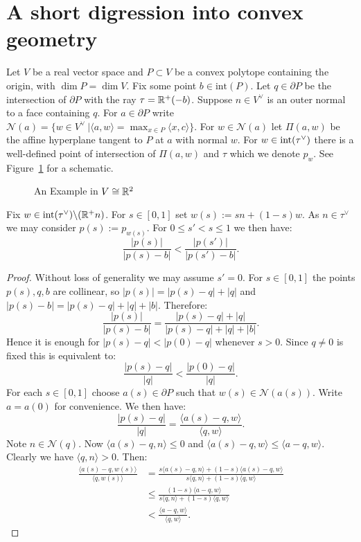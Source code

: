 \section{A short digression into convex geometry}
Let \(V\) be a real vector space and \(P \subset V\) be a convex polytope containing the origin, with \(\dim P = \dim V\). Fix some point \(b \in \text{int}(P)\). Let \(q \in \partial P\) be the intersection of \(\partial P\) with the ray \(\tau = \mathbb{R}^+ (-b)\). Suppose \(n \in V^\vee\) is an outer normal to a face containing \(q\). For \(a \in \partial P\) write \(\mathcal{N}(a) = \{w\in V^\vee \ | \langle a,w \rangle = \max_{x \in P} \langle x,c \rangle \}\). For \(w \in \mathcal{N}(a) \) let \(\Pi(a,w)\) be the affine hyperplane tangent to \(P\) at \(a\) with normal \(w\). For \(w \in \text{int}(\tau^\vee) \) there is a well-defined point of intersection of \(\Pi(a,w)\) and \(\tau\) which we denote \(p_w\). See Figure~\ref{schematic} for a schematic.
\begin{figure}[h] \centering
{}
\caption{An Example in \(V \cong \mathbb{R}^2\)}
\label{schematic}
\end{figure}
\begin{lemma} \label{R(X):Lemma3.1}
Fix \(w \in \text{int}(\tau^\vee) \backslash (\mathbb{R}^+ n)\). For \(s \in [0,1]\) set \(w(s) := sn + (1-s)w\). As \(n \in \tau^\vee \) we may consider \(p(s) := p_{w(s)}\). For \(0 \le s' < s \le 1\) we then have:
\[
\frac{|p(s)|}{|p(s)-b|} < \frac{|p(s')|}{|p(s')-b|}.
\]
\end{lemma}
\begin{proof}
Without loss of generality we may assume \(s' = 0\). For \(s \in [0,1]\) the points \(p(s), q,b\) are collinear, so \(|p(s)|= |p(s)-q|+|q|\) and \(|p(s)-b| =|p(s)-q| +|q| + |b| \). Therefore:
\[
\frac{|p(s)|}{|p(s) - b|} = \frac{|p(s)-q|+|q|}{|p(s)-q| +|q| + |b|}.
\]
Hence it is enough for \(|p(s)-q| < |p(0)-q|\) whenever \(s >0\). Since \(q \neq 0\) is fixed this is equivalent to:
\[
\frac{|p(s) - q|}{|q|} < \frac{|p(0) - q|}{|q|}.
\]
For each \(s \in [0,1]\) choose \(a(s) \in \partial P\) such that \(w(s) \in \mathcal{N}(a(s))\). Write \(a = a(0)\) for convenience. We then have:
\[
\frac{|p(s)-q|}{|q|} = \frac{\langle a(s)-q, w \rangle }{\langle q,w \rangle}.
\]
Note \(n \in \mathcal{N}(q)\). Now \(\langle a(s)-q,n \rangle \le 0\)  and \( \langle a(s) - q,w \rangle \le \langle a - q,w \rangle\). Clearly we have \(\langle q , n \rangle > 0\). Then:
\begin{align*}
\frac{\langle a(s) - q, w(s) \rangle }{\langle q, w(s) \rangle} &= \frac{s\langle a(s)-q, n \rangle + (1-s)\langle a(s)-q,w \rangle}{s \langle q , n \rangle + (1-s) \langle q, w \rangle} \\ &\le \frac{(1-s)\langle a-q, w \rangle }{s \langle q , n \rangle + (1-s) \langle q, w \rangle} \\ &< \frac{\langle a-q, w \rangle }{\langle q,w \rangle}.
\end{align*}
\end{proof}
